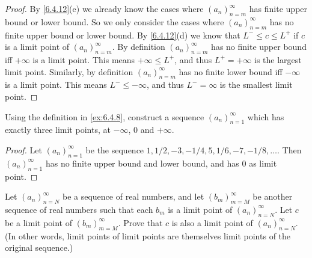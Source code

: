 \begin{proof}
  By \cref{6.4.12}(e) we already know the cases where \((a_n)_{n = m}^\infty\) has finite upper bound or lower bound.
  So we only consider the cases where \((a_n)_{n = m}^\infty\) has no finite upper bound or lower bound.
  By \cref{6.4.12}(d) we know that \(L^- \leq c \leq L^+\) if \(c\) is a limit point of \((a_n)_{n = m}^\infty\).
  By definition \((a_n)_{n = m}^\infty\) has no finite upper bound iff \(+\infty\) is a limit point.
  This means \(+\infty \leq L^+\), and thus \(L^+ = +\infty\) is the largest limit point.
  Similarly, by definition \((a_n)_{n = m}^\infty\) has no finite lower bound iff \(-\infty\) is a limit point.
  This means \(L^- \leq -\infty\), and thus \(L^- = \infty\) is the smallest limit point.
\end{proof}

\begin{ex}\label{ex:6.4.9}
  Using the definition in \cref{ex:6.4.8}, construct a sequence \((a_n)_{n = 1}^\infty\) which has exactly three limit points, at \(-\infty\), \(0\) and \(+\infty\).
\end{ex}

\begin{proof}
  Let \((a_n)_{n = 1}^\infty\) be the sequence \(1, 1/2, -3, -1/4, 5, 1/6, -7, -1/8, \dots\).
  Then \((a_n)_{n = 1}^\infty\) has no finite upper bound and lower bound, and has \(0\) as limit point.
\end{proof}

\begin{ex}\label{ex:6.4.10}
  Let \((a_n)_{n = N}^\infty\) be a sequence of real numbers, and let \((b_m)_{m = M}^\infty\) be another sequence of real numbers such that each \(b_m\) is a limit point of \((a_n)_{n = N}^\infty\).
  Let \(c\) be a limit point of \((b_m)_{m = M}^\infty\).
  Prove that \(c\) is also a limit point of \((a_n)_{n = N}^\infty\).
  (In other words, limit points of limit points are themselves limit points of the original sequence.)
\end{ex}

